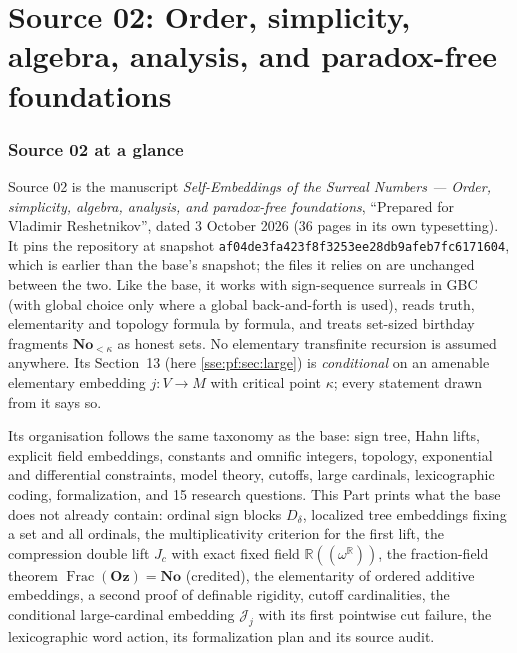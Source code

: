 \documentclass[11pt,a4paper]{article}
\numberwithin{equation}{section}
\theoremstyle{plain}
\theoremstyle{definition}
\theoremstyle{remark}
\newcommand{\No}{\mathbf{No}}
\newcommand{\Oz}{\mathbf{Oz}}
\newcommand{\R}{\mathbb{R}}
\newcommand{\NF}[1]{\R((\omega^{#1}))}
\newcommand{\code}[1]{\texttt{\small #1}}
\newcommand{\Fracpf}{\operatorname{Frac}}
\begin{document}
\part{Source 02: Order, simplicity, algebra, analysis, and paradox-free foundations}\label{sse:part:pf}

\section{Source 02 at a glance}\label{sse:pf:sec:glance}

Source 02 is the manuscript \emph{Self-Embeddings of the Surreal Numbers ---
Order, simplicity, algebra, analysis, and paradox-free foundations},
``Prepared for Vladimir Reshetnikov'', dated 3 October 2026 (36 pages in
its own typesetting). It pins the repository at snapshot
\code{af04de3fa423f8f3253ee28db9afeb7fc6171604}, which is earlier than the
base's snapshot; the files it relies on are unchanged between the two.
Like the base, it works with sign-sequence surreals in GBC (with global
choice only where a global back-and-forth is used), reads truth,
elementarity and topology formula by formula, and treats set-sized
birthday fragments $\No_{<\kappa}$ as honest sets. No elementary
transfinite recursion is assumed anywhere. Its Section~13 (here
\cref{sse:pf:sec:large}) is \emph{conditional} on an amenable elementary
embedding $j:V\to M$ with critical point $\kappa$; every statement drawn
from it says so.

Its organisation follows the same taxonomy as the base: sign tree, Hahn
lifts, explicit field embeddings, constants and omnific integers,
topology, exponential and differential constraints, model theory,
cutoffs, large cardinals, lexicographic coding, formalization, and 15
research questions. This Part prints what the base does not already
contain: ordinal sign blocks $D_\delta$, localized tree embeddings fixing
a set and all ordinals, the multiplicativity criterion for the first lift,
the compression double lift $J_c$ with exact fixed field $\NF{\R}$, the
fraction-field theorem $\Fracpf(\Oz)=\No$ (credited), the elementarity of
ordered additive embeddings, a second proof of definable rigidity, cutoff
cardinalities, the conditional large-cardinal embedding $\mathcal J_j$ with
its first pointwise cut failure, the lexicographic word action, its
formalization plan and its source audit.
\end{document}
